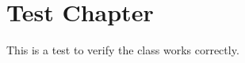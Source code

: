 \documentclass{UCTScienceThesis}
\begin{document}
\chapter{Test Chapter}
This is a test to verify the class works correctly.
\end{document}
